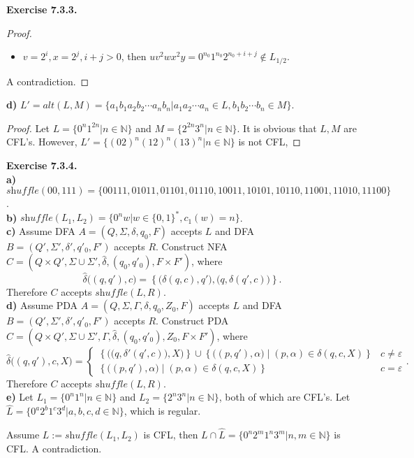 \documentclass[a4paper]{article}
\newtheorem*{proof}{Proof}
\newenvironment{exercise}[1]{
	\par
	\noindent\textbf{Exercise #1.}\quad
}{
	\par
	\bigskip
}
\newcommand{\Nset}{\mathbb{N}}
\begin{document}
\begin{exercise}{7.3.3}
\begin{proof}
\begin{itemize}
            \item $v=2^i,x=2^j,i+j>0$, then $uv^2wx^2y=0^{n_0}1^{n_0}2^{n_0+i+j}\notin L_{1/2}$.
        \end{itemize}
        A contradiction.
    \end{proof}
\textbf{d)} $L'=\textit{alt}(L,M)=\{a_1b_1a_2b_2\cdots a_nb_n|a_1a_2\cdots a_n\in L,b_1b_2\cdots b_n\in M\}$.
    \begin{proof}
        Let $L=\{0^n1^{2n}|n\in\Nset\}$ and $M=\{2^{2n}3^n|n\in\Nset\}$. It is obvious that $L,M$ are CFL's.
        However, $L'=\{(02)^n(12)^n(13)^n|n\in\Nset\}$ is not CFL,
    \end{proof}
\end{exercise}

\begin{exercise}{7.3.4} \hspace{0pt}\\
\textbf{a)} $\textit{shuffle}(00,111)=\{00111,01011,01101,01110,10011,10101,10110,11001,11010,11100\}$.\\
\textbf{b)} $\textit{shuffle}(L_1,L_2)=\{0^nw|w\in\{0,1\}^*,c_1(w)=n\}$.\\
\textbf{c)}
        Assume DFA $A=(Q,\Sigma,\delta,q_0,F)$ accepts $L$ and DFA $B=(Q',\Sigma',\delta',q'_0,F')$ accepts $R$.
        Construct NFA $C=(Q\times Q',\Sigma\cup\Sigma',\hat{\delta},(q_0,q'_0),F\times F')$, where
        $$
        \hat{\delta}\Big((q,q'),c\Big)=\left\{\Big(\delta(q,c),q'\Big),\Big(q,\delta(q',c)\Big)\right\}.
        $$
        Therefore $C$ accepts $\textit{shuffle}(L,R)$.\\
\textbf{d)}
        Assume PDA $A=(Q,\Sigma,\Gamma,\delta,q_0,Z_0,F)$ accepts $L$ and DFA $B=(Q',\Sigma',\delta',q'_0,F')$ accepts $R$.
        Construct PDA $C=(Q\times Q',\Sigma\cup\Sigma',\Gamma,\hat{\delta},(q_0,q'_0),Z_0,F\times F')$, where
        $$
        \hat{\delta}\Big((q,q'),c,X\Big)=\begin{cases}
            \left\{\Big(\big(q,\delta'(q',c)\big),X\Big)\right\}\cup\left\{\Big((p,q'),\alpha\Big)\middle|
            (p,\alpha)\in\delta(q,c,X)\right\} & c\neq\varepsilon\\
            \left\{\Big((p,q'),\alpha\Big)\middle| (p,\alpha)\in\delta(q,c,X)\right\} & c=\varepsilon
        \end{cases}.
        $$
        Therefore $C$ accepts $\textit{shuffle}(L,R)$.\\
\textbf{e)}
        Let $L_1=\{0^n1^n|n\in\Nset\}$ and $L_2=\{2^n3^n|n\in\Nset\}$, both of which are CFL's.
        Let $\widehat{L}=\{0^a2^b1^c3^d|a,b,c,d\in\Nset\}$, which is regular.\par
        Assume $L:=\textit{shuffle}(L_1,L_2)$ is CFL, then $L\cap\widehat{L}=\{0^n2^m1^n3^m|n,m\in\Nset\}$ is CFL.
        A contradiction.
\end{exercise}
\end{document}
